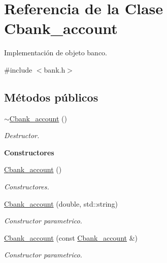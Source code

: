\hypertarget{class_cbank__account}{}\section{Referencia de la Clase Cbank\+\_\+account}
\label{class_cbank__account}


Implementación de objeto banco.  




{\ttfamily \#include $<$bank.\+h$>$}

\subsection*{Métodos públicos}
\begin{DoxyCompactItemize}
\item 
\hyperlink{class_cbank__account_a6a445565be4138841cd9ae19a284c6a3}{$\sim$\+Cbank\+\_\+account} ()\hypertarget{class_cbank__account_a6a445565be4138841cd9ae19a284c6a3}{}\label{class_cbank__account_a6a445565be4138841cd9ae19a284c6a3}

\begin{DoxyCompactList}\small\item\em Destructor. \end{DoxyCompactList}\end{DoxyCompactItemize}
\begin{Indent}{\bf Constructores}\par
\begin{DoxyCompactItemize}
\item 
\hyperlink{class_cbank__account_ab33d4d440a059df6781a6007e02ecf60}{Cbank\+\_\+account} ()
\begin{DoxyCompactList}\small\item\em Constructores. \end{DoxyCompactList}\item 
\hyperlink{class_cbank__account_adf010826ed71b599d7b9292e1c7ff971}{Cbank\+\_\+account} (double, std\+::string)
\begin{DoxyCompactList}\small\item\em Constructor parametrico. \end{DoxyCompactList}\item 
\hyperlink{class_cbank__account_ae249ba9bfa4100cdc8deff17133e2914}{Cbank\+\_\+account} (const \hyperlink{class_cbank__account}{Cbank\+\_\+account} \&)
\begin{DoxyCompactList}\small\item\em Constructor parametrico. \end{DoxyCompactList}\end{DoxyCompactItemize}
\end{Indent}
